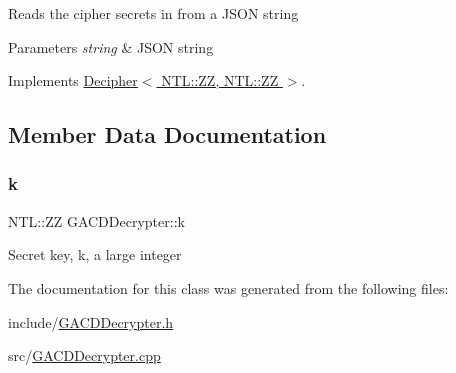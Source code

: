 Reads the cipher secrets in from a J\+S\+ON string 
\begin{DoxyParams}{Parameters}
{\em string} & J\+S\+ON string \\
\hline
\end{DoxyParams}


Implements \hyperlink{classDecipher_a39aea002012130201e12a8fa7d84dda5}{Decipher$<$ N\+T\+L\+::\+Z\+Z, N\+T\+L\+::\+Z\+Z $>$}.



\subsection{Member Data Documentation}
\mbox{\label{classGACDDecrypter_add375694b9dd663ac42f6244f4d8ea53}} 
\subsubsection{\texorpdfstring{k}{k}}
{\footnotesize\ttfamily N\+T\+L\+::\+ZZ G\+A\+C\+D\+Decrypter\+::k\hspace{0.3cm}{\ttfamily [private]}}

Secret key, {\ttfamily k}, a large integer 

The documentation for this class was generated from the following files\+:\begin{DoxyCompactItemize}
\item 
include/\hyperlink{GACDDecrypter_8h}{G\+A\+C\+D\+Decrypter.\+h}\item 
src/\hyperlink{GACDDecrypter_8cpp}{G\+A\+C\+D\+Decrypter.\+cpp}\end{DoxyCompactItemize}
